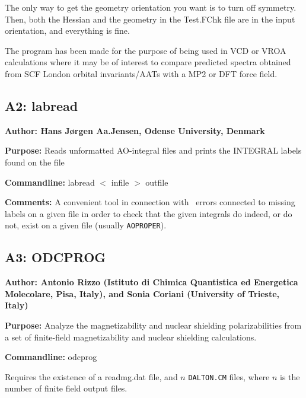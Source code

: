 The only way to get the geometry orientation you want is to turn
        off symmetry. 
        Then, both the Hessian and the geometry in the Test.FChk file are
        in the input orientation, and everything is fine.

The program has been made for the purpose of being used in VCD or
VROA 
calculations where it may be of interest to compare predicted spectra
obtained from SCF London orbital invariants/AATs with a MP2 or DFT force field.

\subsection*{A2: labread}

\noindent
{\large\bf Author: \normalsize\large Hans J\o rgen Aa.Jensen,
Odense University, Denmark}

\smallskip

\noindent 
{\bf Purpose:} Reads unformatted AO-integral files and prints the
INTEGRAL labels found on the file

\smallskip
\noindent
{\bf Commandline:} labread $<$ infile $>$ outfile

\smallskip
\noindent
{\bf Comments:}  A convenient tool in connection with \siraba\ errors
connected to missing labels on a given file in order to check that the
given integrals do indeed, or do not, exist on a given file (usually
\verb|AOPROPER|). 

\subsection*{A3: ODCPROG}

\noindent
{\large\bf Author: \normalsize\large Antonio Rizzo (Istituto di
Chimica Quantistica ed Energetica Molecolare, Pisa, Italy), and
Sonia Coriani (University of Trieste, Italy)}

\smallskip

\noindent 
{\bf Purpose:} Analyze the magnetizability and nuclear shielding
polarizabilities from a set of finite-field magnetizability and
nuclear shielding calculations.

\smallskip
\noindent
{\bf Commandline:} odcprog

Requires the existence of a readmg.dat file, and $n$ \verb|DALTON.CM| files,
where $n$ is the number of finite field output files.


